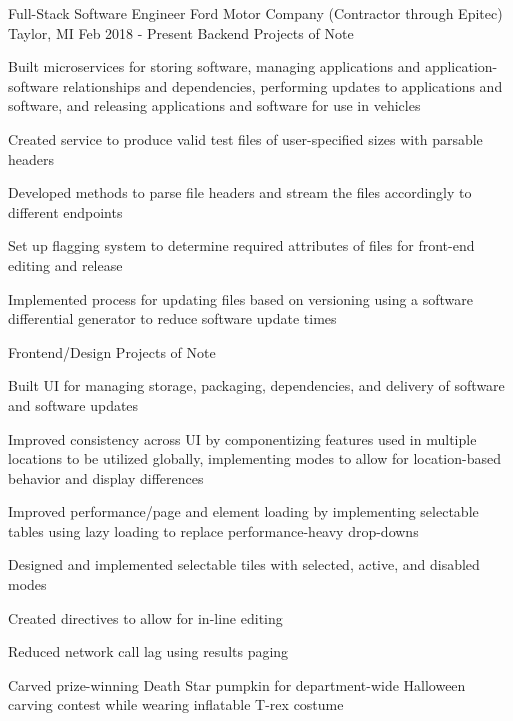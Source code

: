 
\begin{cventries}
  \cventry
    {Full-Stack Software Engineer} %
    {Ford Motor Company (Contractor through Epitec)} %
    {Taylor, MI} %
    {Feb 2018 - Present} %
    {Backend Projects of Note}
    {
      \begin{cvitems} %
        \item {Built microservices for storing software, managing applications and application-software relationships and dependencies, performing updates to applications and software, and releasing applications and software for use in vehicles}
       \item  {Created service to produce valid test files of user-specified sizes with parsable headers}
       \item  {Developed methods to parse file headers and stream the files accordingly to different endpoints}
       \item  {Set up flagging system to determine required attributes of files for front-end editing and release}
       \item  {Implemented process for updating files based on versioning using a software differential generator to reduce software update times}
      \end{cvitems}
    {Frontend/Design Projects of Note}
    {
      \begin{cvitems} %
        \item {Built UI for managing storage, packaging, dependencies, and delivery of software and software updates}
       \item  {Improved consistency across UI by componentizing features used in multiple locations to be utilized globally, implementing modes to allow for location-based behavior and display differences}
       \item  {Improved performance/page and element loading by implementing selectable tables using lazy loading to replace performance-heavy drop-downs}
       \item  {Designed and implemented selectable tiles with selected, active, and disabled modes}
       \item  {Created directives to allow for in-line editing}
       \item  {Reduced network call lag using results paging}
       \item  {Carved prize-winning Death Star pumpkin for department-wide Halloween carving contest while wearing inflatable T-rex costume}

\end{cvitems}}}
\end{cventries}
